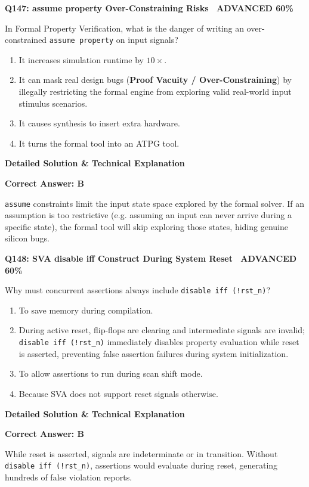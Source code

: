 \documentclass[11pt,a4paper]{article}
\newcommand{\badgeadv}{{\color{white}\colorbox{advred}{\bfseries\sffamily\tiny\ ADVANCED 60\%\ }}}
\newenvironment{qbox}[2]{%
  \begin{mdframed}[style=qstyle]%
  {\bfseries\sffamily\color{primaryblue}#1 \hfill #2}\par\vspace{2pt}%
}{%
  \end{mdframed}%
}
\newenvironment{ansbox}{%
  \begin{mdframed}[style=ansstyle]%
  {\bfseries\sffamily\color{ansgreen}\small Detailed Solution \& Technical Explanation}\par\vspace{2pt}\small%
}{%
  \end{mdframed}%
}
\begin{document}
\begin{qbox}{Q147: assume property Over-Constraining Risks}{\badgeadv}
In Formal Property Verification, what is the danger of writing an over-constrained \texttt{assume property} on input signals?
\begin{enumerate}[label=\textbf{\Alph*.}]
  \item It increases simulation runtime by $10\times$.
  \item It can mask real design bugs (\textbf{Proof Vacuity / Over-Constraining}) by illegally restricting the formal engine from exploring valid real-world input stimulus scenarios.
  \item It causes synthesis to insert extra hardware.
  \item It turns the formal tool into an ATPG tool.
\end{enumerate}
\end{qbox}
\begin{ansbox}
\textbf{Correct Answer: B}

\texttt{assume} constraints limit the input state space explored by the formal solver. If an assumption is too restrictive (e.g. assuming an input can never arrive during a specific state), the formal tool will skip exploring those states, hiding genuine silicon bugs.
\end{ansbox}

\begin{qbox}{Q148: SVA disable iff Construct During System Reset}{\badgeadv}
Why must concurrent assertions always include \texttt{disable iff (!rst\_n)}?
\begin{enumerate}[label=\textbf{\Alph*.}]
  \item To save memory during compilation.
  \item During active reset, flip-flops are clearing and intermediate signals are invalid; \texttt{disable iff (!rst\_n)} immediately disables property evaluation while reset is asserted, preventing false assertion failures during system initialization.
  \item To allow assertions to run during scan shift mode.
  \item Because SVA does not support reset signals otherwise.
\end{enumerate}
\end{qbox}
\begin{ansbox}
\textbf{Correct Answer: B}

While reset is asserted, signals are indeterminate or in transition. Without \texttt{disable iff (!rst\_n)}, assertions would evaluate during reset, generating hundreds of false violation reports.
\end{ansbox}
\end{document}
